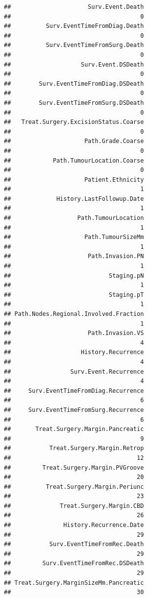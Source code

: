 \documentclass{article}\usepackage[]{graphicx}\usepackage[]{color}
\makeatletter
\newenvironment{kframe}{%
 \def\at@end@of@kframe{}%
 \ifinner\ifhmode%
  \def\at@end@of@kframe{\end{minipage}}%
  \begin{minipage}{\columnwidth}%
 \fi\fi%
 \def\FrameCommand##1{\hskip\@totalleftmargin \hskip-\fboxsep
 \colorbox{shadecolor}{##1}\hskip-\fboxsep
     \hskip-\linewidth \hskip-\@totalleftmargin \hskip\columnwidth}%
 \MakeFramed {\advance\hsize-\width
   \@totalleftmargin\z@ \linewidth\hsize
   \@setminipage}}%
 {\par\unskip\endMakeFramed%
 \at@end@of@kframe}
\newenvironment{knitrout}{}{} %
\makeatother
\begin{document}
\begin{knitrout}
\begin{kframe}
\begin{verbatim}
##                      Surv.Event.Death 
##                                     0 
##          Surv.EventTimeFromDiag.Death 
##                                     0 
##          Surv.EventTimeFromSurg.Death 
##                                     0 
##                    Surv.Event.DSDeath 
##                                     0 
##        Surv.EventTimeFromDiag.DSDeath 
##                                     0 
##        Surv.EventTimeFromSurg.DSDeath 
##                                     0 
##   Treat.Surgery.ExcisionStatus.Coarse 
##                                     0 
##                     Path.Grade.Coarse 
##                                     0 
##            Path.TumourLocation.Coarse 
##                                     0 
##                     Patient.Ethnicity 
##                                     1 
##             History.LastFollowup.Date 
##                                     1 
##                   Path.TumourLocation 
##                                     1 
##                     Path.TumourSizeMm 
##                                     1 
##                      Path.Invasion.PN 
##                                     1 
##                            Staging.pN 
##                                     1 
##                            Staging.pT 
##                                     1 
## Path.Nodes.Regional.Involved.Fraction 
##                                     1 
##                      Path.Invasion.VS 
##                                     4 
##                    History.Recurrence 
##                                     4 
##                 Surv.Event.Recurrence 
##                                     4 
##     Surv.EventTimeFromDiag.Recurrence 
##                                     6 
##     Surv.EventTimeFromSurg.Recurrence 
##                                     6 
##       Treat.Surgery.Margin.Pancreatic 
##                                     9 
##           Treat.Surgery.Margin.Retrop 
##                                    12 
##         Treat.Surgery.Margin.PVGroove 
##                                    20 
##          Treat.Surgery.Margin.Periunc 
##                                    23 
##              Treat.Surgery.Margin.CBD 
##                                    26 
##               History.Recurrence.Date 
##                                    29 
##           Surv.EventTimeFromRec.Death 
##                                    29 
##         Surv.EventTimeFromRec.DSDeath 
##                                    29 
## Treat.Surgery.MarginSizeMm.Pancreatic 
##                                    30 

\end{verbatim}
\end{kframe}
\end{knitrout}
\end{document}
